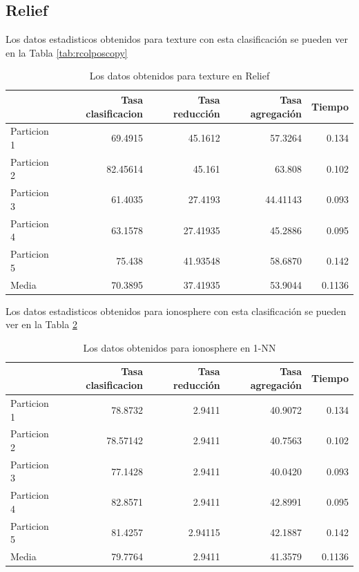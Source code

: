 \documentclass[12pt,a4paper]{article}
\begin{document}
\subsection{Relief}
Los datos estadisticos obtenidos para texture con esta clasificación se pueden ver en la Tabla \ref{tab:rcolposcopy}
\begin{table}[H]
	\centering
	\caption {Los datos obtenidos para texture en Relief} \label{tab:r} 
	
	\begin{tabular}{|l|r|r|r|r|}
		\hline
		& Tasa clasificacion &Tasa reducción &Tasa agregación & Tiempo\\
		\hline
		Particion 1 & 69.4915 &45.1612 & 57.3264& 0.134 \\
		\hline
		Particion 2 & 82.45614 & 45.161& 63.808& 0.102 \\
		\hline
		Particion 3 & 61.4035 & 27.4193& 44.41143& 0.093\\
		\hline
		Particion 4 & 63.1578 & 27.41935& 45.2886 &  0.095\\
		\hline
		Particion 5 & 75.438 & 41.93548&58.6870 & 0.142 \\
		\hline
		Media &70.3895 &37.41935 &53.9044 & 0.1136 \\
		\hline
	\end{tabular}
\end{table}
Los datos estadisticos obtenidos para ionosphere con esta clasificación se pueden ver en la Tabla \ref{tab:rionosphere}
\begin{table}[H]
	\centering
	\caption {Los datos obtenidos para ionosphere en 1-NN} \label{tab:rionosphere} 
	
	\begin{tabular}{|l|r|r|r|r|}
		\hline
		& Tasa clasificacion &Tasa reducción &Tasa agregación & Tiempo\\
		\hline
		Particion 1 & 78.8732 &2.9411 & 40.9072& 0.134 \\
		\hline
		Particion 2 & 78.57142 & 2.9411& 40.7563& 0.102 \\
		\hline
		Particion 3 &  77.1428 & 2.9411& 40.0420& 0.093\\
		\hline
		Particion 4 & 82.8571 & 2.9411&42.8991 &  0.095\\
		\hline
		Particion 5 & 81.4257 & 2.94115&42.1887 & 0.142 \\
		\hline
		Media & 79.7764 & 2.9411 &41.3579 & 0.1136 \\
		\hline
	\end{tabular}
\end{table}
\end{document}
